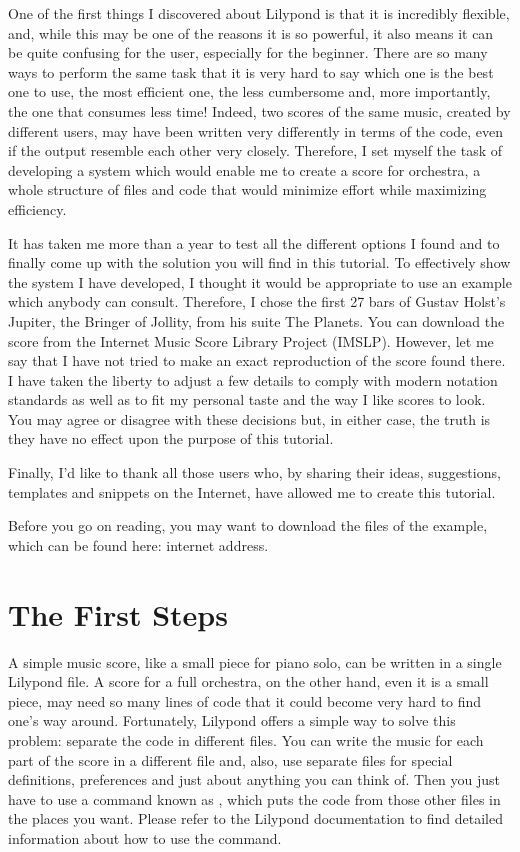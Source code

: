 \documentclass[../../LilyPond-Tutorials]{subfiles}
\begin{document}
One of the first things I discovered about Lilypond is that it is incredibly flexible, and, while this may be one of the reasons it is so powerful, it also means it can be quite confusing for the user, especially for the beginner.
There are so many ways to perform the same task that it is very hard to say which one is the best one to use, the most efficient one, the less cumbersome and, more importantly, the one that consumes less time!
Indeed, two scores of the same music, created by different users, may have been written very differently in terms of the code, even if the output resemble each other very closely.
Therefore, I set myself the task of developing a system which would enable me to create a score for orchestra, a whole structure of files and code that would minimize effort while maximizing efficiency.

It has taken me more than a year to test all the different options I found and to finally come up with the solution you will find in this tutorial.
To effectively show the system I have developed, I thought it would be appropriate to use an example which anybody can consult.
Therefore, I chose the first 27 bars of Gustav Holst's Jupiter, the Bringer of Jollity, from his suite The Planets.
You can download the score from the Internet Music Score Library Project (IMSLP).
However, let me say that I have not tried to make an exact reproduction of the score found there.
I have taken the liberty to adjust a few details to comply with modern notation standards as well as to fit my personal taste and the way I like scores to look.
You may agree or disagree with these decisions but, in either case, the truth is they have no effect upon the purpose of this tutorial.

Finally, I'd like to thank all those users who, by sharing their ideas, suggestions, templates and snippets on the Internet, have allowed me to create this tutorial.

Before you go on reading, you may want to download the files of the example, which can be found here: internet address.

\section{The First Steps}

A simple music score, like a small piece for piano solo, can be written in a single Lilypond file.
A score for a full orchestra, on the other hand, even it is a small piece, may need so many lines of code that it could become very hard to find one's way around. 
Fortunately, Lilypond offers a simple way to solve this problem: separate the code in different files.
You can write the music for each part of the score in a different file and, also, use separate files for special definitions, preferences and just about anything you can think of. 
Then you just have to use a command known as , which puts the code from those other files in the places you want.
Please refer to the Lilypond documentation to find detailed information about how to use the  command.
\end{document}
